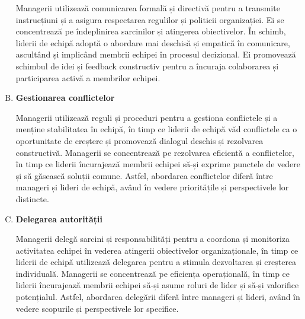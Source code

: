\documentclass[a4paper, 12pt]{article}
\begin{document}
\begin{enumerate}[A)]
		\quad\quad Managerii utilizează comunicarea formală și directivă pentru a transmite instrucțiuni și a asigura respectarea regulilor și politicii organizației. Ei se concentrează pe îndeplinirea sarcinilor și atingerea obiectivelor. În schimb, liderii de echipă adoptă o abordare mai deschisă și empatică în comunicare, ascultând și implicând membrii echipei în procesul decizional. Ei promovează schimbul de idei și feedback constructiv pentru a încuraja colaborarea și participarea activă a membrilor echipei.

		\item \textbf{Gestionarea conflictelor}

		\quad\quad Managerii utilizează reguli și proceduri pentru a gestiona conflictele și a menține stabilitatea în echipă, în timp ce liderii de echipă văd conflictele ca o oportunitate de creștere și promovează dialogul deschis și rezolvarea constructivă. Managerii se concentrează pe rezolvarea eficientă a conflictelor, în timp ce liderii încurajează membrii echipei să-și exprime punctele de vedere și să găsească soluții comune. Astfel, abordarea conflictelor diferă între manageri și lideri de echipă, având în vedere prioritățile și perspectivele lor distincte.

		\item \textbf{Delegarea autorității}

		\quad\quad Managerii delegă sarcini și responsabilități pentru a coordona și monitoriza activitatea echipei în vederea atingerii obiectivelor organizaționale, în timp ce liderii de echipă utilizează delegarea pentru a stimula dezvoltarea și creșterea individuală. Managerii se concentrează pe eficiența operațională, în timp ce liderii încurajează membrii echipei să-și asume roluri de lider și să-și valorifice potențialul. Astfel, abordarea delegării diferă între manageri și lideri, având în vedere scopurile și perspectivele lor specifice.

	\end{enumerate}

\end{document}
